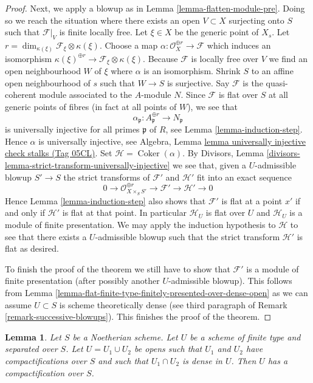 \documentclass{amsart}
\theoremstyle{plain}
\newtheorem{lemma}[subsection]{Lemma}
\theoremstyle{definition}
\theoremstyle{remark}
\numberwithin{equation}{subsection}
\def\Coker{\mathop{\mathrm{Coker}}}
\begin{document}
\begin{proof}
\medskip\noindent
Next, we apply a blowup as in Lemma \ref{lemma-flatten-module-pre}.
Doing so we reach the situation where there exists an
open $V \subset X$ surjecting onto $S$ such that $\mathcal{F}|_V$
is finite locally free. Let $\xi \in X$ be the generic point of $X_s$. Let
$r = \dim_{\kappa(\xi)} \mathcal{F}_\xi \otimes \kappa(\xi)$.
Choose a map $\alpha : \mathcal{O}_X^{\oplus r} \to \mathcal{F}$
which induces an isomorphism
$\kappa(\xi)^{\oplus r} \to \mathcal{F}_\xi \otimes \kappa(\xi)$.
Because $\mathcal{F}$ is locally free over $V$ we find an open neighbourhood
$W$ of $\xi$ where $\alpha$ is an isomorphism. Shrink $S$ to an affine open
neighbourhood of $s$ such that $W \to S$ is surjective. Say $\mathcal{F}$
is the quasi-coherent module associated to the $A$-module $N$. Since
$\mathcal{F}$ is flat over $S$ at all generic points of fibres
(in fact at all points of $W$), we see that
$$
\alpha_\mathfrak p : A_\mathfrak p^{\oplus r} \to N_\mathfrak p
$$
is universally injective for all primes $\mathfrak p$ of $R$, see
Lemma \ref{lemma-induction-step}. Hence $\alpha$ is universally injective,
see Algebra, Lemma \href{https://stacks.math.columbia.edu/tag/05CL}{lemma universally injective check stalks (Tag 05CL)}.
Set $\mathcal{H} = \Coker(\alpha)$.
By Divisors, Lemma \ref{divisors-lemma-strict-transform-universally-injective}
we see that, given a $U$-admissible blowup $S' \to S$
the strict transforms of $\mathcal{F}'$ and $\mathcal{H}'$
fit into an exact sequence
$$
0 \to \mathcal{O}_{X \times_S S'}^{\oplus r} \to \mathcal{F}'
\to \mathcal{H}' \to 0
$$
Hence Lemma \ref{lemma-induction-step} also shows that $\mathcal{F}'$
is flat at a point $x'$ if and only if
$\mathcal{H}'$ is flat at that point. In particular $\mathcal{H}_U$ is
flat over $U$ and $\mathcal{H}_U$ is a module of finite presentation.
We may apply the induction hypothesis to $\mathcal{H}$ to see that
there exists a $U$-admissible blowup such that the strict transform
$\mathcal{H}'$ is flat as desired.

\medskip\noindent
To finish the proof of the theorem we still have to show that $\mathcal{F}'$
is a module of finite presentation (after possibly another
$U$-admissible blowup). This follows from
Lemma \ref{lemma-flat-finite-type-finitely-presented-over-dense-open}
as we can assume $U \subset S$ is scheme theoretically dense (see
third paragraph of Remark \ref{remark-successive-blowups}).
This finishes the proof of the theorem.
\end{proof}


\begin{lemma}
\label{lemma-two-compactifications}
Let $S$ be a Noetherian scheme. Let $U$ be a scheme of finite type
and separated over $S$. Let $U = U_1 \cup U_2$ be opens such that
$U_1$ and $U_2$ have compactifications over $S$ and such that
$U_1 \cap U_2$ is dense in $U$. Then $U$ has a compactification over $S$.
\end{lemma}
\end{document}
